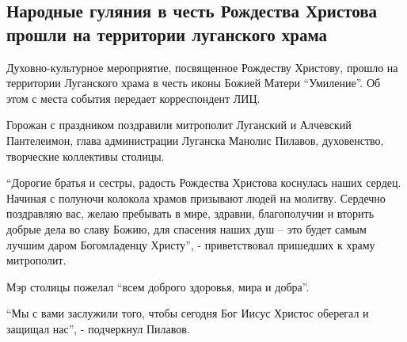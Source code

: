  
 
 
 
 
\subsection{Народные гуляния в честь Рождества Христова прошли на территории луганского храма}
\label{sec:07_01_2022.stz.news.lnr.lug_info.1.guljania_rozhdestvo_lugansk_hram}


Духовно-культурное мероприятие, посвященное Рождеству Христову, прошло на
территории Луганского храма в честь иконы Божией Матери \enquote{Умиление}. Об этом с
места события передает корреспондент ЛИЦ.


Горожан с праздником поздравили митрополит Луганский и Алчевский Пантелеимон,
глава администрации Луганска Манолис Пилавов, духовенство, творческие
коллективы столицы.


\enquote{Дорогие братья и сестры, радость Рождества Христова коснулась наших сердец.
Начиная с полуночи колокола храмов призывают людей на молитву. Сердечно
поздравляю вас, желаю пребывать в мире, здравии, благополучии и вторить добрые
дела во славу Божию, для спасения наших душ – это будет самым лучшим даром
Богомладенцу Христу}, - приветствовал пришедших к храму митрополит.


Мэр столицы пожелал \enquote{всем доброго здоровья, мира и добра}.

\enquote{Мы с вами заслужили того, чтобы сегодня Бог Иисус Христос оберегал и защищал
нас}, - подчеркнул Пилавов.

